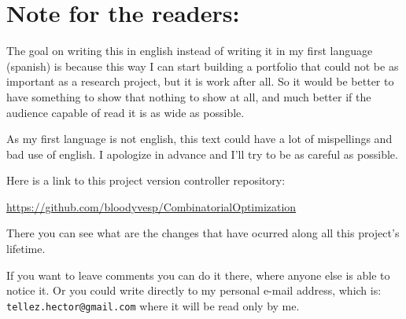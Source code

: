 \chapter*{Note for the readers:}
    The goal on writing this in english instead of writing it in my first language (spanish) is because 
    this way I can start building a portfolio that could not be as important as a research project, but
    it is work after all. So it would be better to have something to show that nothing to show at all, 
    and much better if the audience capable of read it is as wide as possible.\pn
    
    As my first language is not english, this text could have a lot of mispellings and
    bad use of english. I apologize in advance and I'll try to be as careful as possible.\pn
    
    Here is a link to this project version controller repository:\par
    \href{https://github.com/bloodyvesp/CombinatorialOptimization}{https://github.com/bloodyvesp/CombinatorialOptimization}\par
    There you can see what are the changes that have ocurred along all this project's lifetime.\pn
    
    If you want to leave comments you can do it there, where anyone else is able to notice it. Or you could 
    write directly to my personal e-mail address, which is: \texttt{tellez.hector@gmail.com} where it will be read only
    by me.
